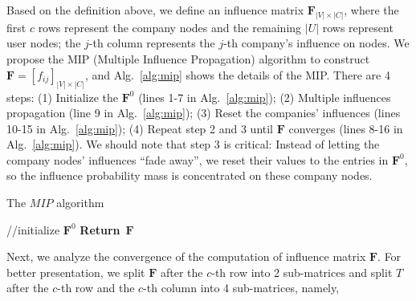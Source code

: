 \documentclass{llncs}
\begin{document}
Based on the definition above, we define an influence matrix $\mathbf{F}_{|V| \times |C|}$, where the first $c$ rows represent the company nodes and the remaining $|U|$ rows represent user nodes; the $j$-th column represents the $j$-th company's influence on nodes. 
We propose the MIP (Multiple Influence Propagation) algorithm to construct  $\mathbf{F} = [f_{ij}]_{|V| \times |C|}$, and
Alg.~\ref{alg:mip} shows the details of the MIP. 
There are 4 steps: (1) Initialize the  $\mathbf{F} ^{0}$ (lines 1-7 in Alg.~\ref{alg:mip}); (2) Multiple influences propagation (line 9 in Alg.~\ref{alg:mip}); (3) Reset the companies' influences (lines 10-15 in Alg.~\ref{alg:mip}); (4) Repeat step 2 and 3 until $\mathbf{F}$ converges (lines 8-16 in Alg.~\ref{alg:mip}).
We should note that step 3 is critical: Instead of letting the company nodes' influences ``fade away'', we reset their values to the entries in $\mathbf{F} ^{0}$, so the influence probability mass is concentrated on these company nodes.
\vspace*{-0.15cm}
\begin{algorithm}[tbh]
\SetAlFnt{\footnotesize} %
\caption{The $MIP$ algorithm} \label{alg:mip}
\vspace*{-0.15cm}
\begin{multicols}{2}
//initialize $\mathbf{F}^{0}$\;
 {
}
{}
\textbf{Return}{~$\mathbf{F}$}\;
\end{multicols}
\vspace*{-0.05cm}
\end{algorithm}
\vspace*{-0.15cm}

Next, we analyze the convergence of the computation of influence matrix $\mathbf{F}$. For better presentation, we split $\mathbf{F}$ after the $c$-th row into  2 sub-matrices and split $T$ after the $c$-th row and the $c$-th column into 4 sub-matrices, namely,
\end{document}
